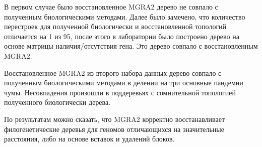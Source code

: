 В первом случае было восстановленное MGRA2 дерево не совпало с полученным биологическими методами.
Далее было замечено, что количество перестроек для полученной биологически и восстановленной топологий отличается на 1 из 95,
после этого в лаборатории было построено дерево на основе матрицы наличия/отсутствия гена.
Это дерево совпало с восстановленным MGRA2.

Восстановленное MGRA2 из второго набора данных дерево совпало с полученным биологическими методами в делении на три основные пандемии чумы.
Несовпадения произошли в поддеревьях с сомнительной топологией полученного биологически дерева.

По результатам можно сказать, что MGRA2 корректно восстанавливает филогенетические деревья для геномов отличающихся на значительные расстояния,
либо на основе вставок и удалений блоков.
